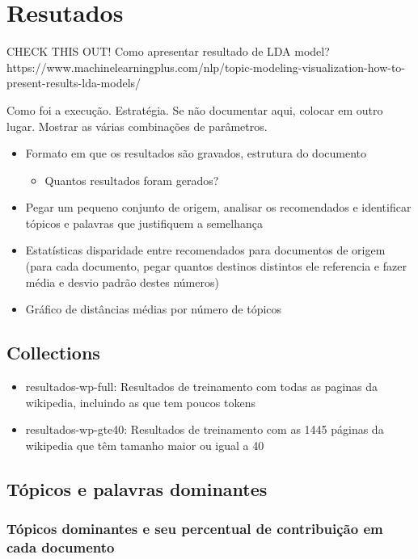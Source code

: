 \section{Resutados}

CHECK THIS OUT!
Como apresentar resultado de LDA model? https://www.machinelearningplus.com/nlp/topic-modeling-visualization-how-to-present-results-lda-models/

Como foi a execução. Estratégia. Se não documentar aqui, colocar em outro lugar.
Mostrar as várias combinações de parâmetros.

\begin{itemize}
    \item Formato em que os resultados são gravados, estrutura do documento
    \begin{itemize}
        \item Quantos resultados foram gerados?
    \end{itemize}
    \item Pegar um pequeno conjunto de origem, analisar os recomendados e identificar tópicos e palavras que justifiquem a semelhança
    \item Estatísticas disparidade entre recomendados para documentos de origem (para cada documento, pegar quantos destinos distintos ele 
    referencia e fazer média e desvio padrão destes números)
    \item Gráfico de distâncias médias por número de tópicos
\end{itemize}

\subsection{Collections}

\begin{itemize}
    \item resultados-wp-full: Resultados de treinamento com todas as paginas da wikipedia, incluindo as que tem poucos tokens
    \item resultados-wp-gte40: Resultados de treinamento com as 1445 páginas da wikipedia que têm tamanho maior ou igual a 40
\end{itemize}

\subsection{Tópicos e palavras dominantes}

\subsubsection{Tópicos dominantes e seu percentual de contribuição em cada documento}

